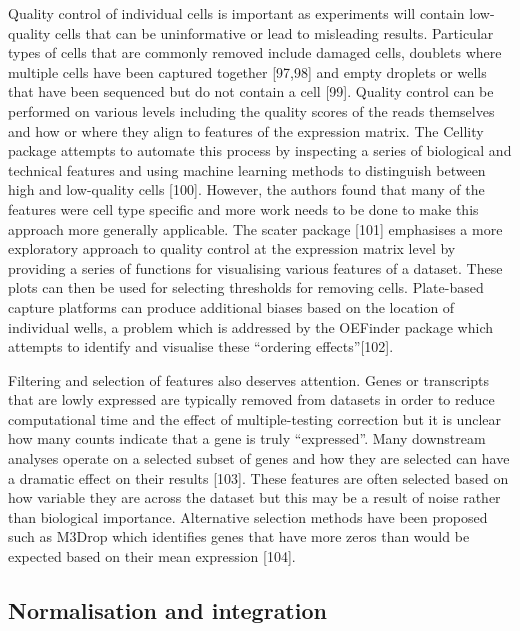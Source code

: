 \documentclass[11pt,a4paper,titlepage,twoside,openright]{style/unimelbthesis}
\theoremstyle{definition}
\theoremstyle{definition}
\theoremstyle{definition}
\theoremstyle{remark}
\begin{document}
\begin{mainmatter}
Quality control of individual cells is important as experiments will contain low-quality cells that can be uninformative or lead to misleading results. Particular types of cells that are commonly removed include damaged cells, doublets where multiple cells have been captured together {[}97,98{]} and empty droplets or wells that have been sequenced but do not contain a cell {[}99{]}. Quality control can be performed on various levels including the quality scores of the reads themselves and how or where they align to features of the expression matrix. The Cellity package attempts to automate this process by inspecting a series of biological and technical features and using machine learning methods to distinguish between high and low-quality cells {[}100{]}. However, the authors found that many of the features were cell type specific and more work needs to be done to make this approach more generally applicable. The scater package {[}101{]} emphasises a more exploratory approach to quality control at the expression matrix level by providing a series of functions for visualising various features of a dataset. These plots can then be used for selecting thresholds for removing cells. Plate-based capture platforms can produce additional biases based on the location of individual wells, a problem which is addressed by the OEFinder package which attempts to identify and visualise these \enquote{ordering effects}{[}102{]}.

Filtering and selection of features also deserves attention. Genes or transcripts that are lowly expressed are typically removed from datasets in order to reduce computational time and the effect of multiple-testing correction but it is unclear how many counts indicate that a gene is truly \enquote{expressed}. Many downstream analyses operate on a selected subset of genes and how they are selected can have a dramatic effect on their results {[}103{]}. These features are often selected based on how variable they are across the dataset but this may be a result of noise rather than biological importance. Alternative selection methods have been proposed such as M3Drop which identifies genes that have more zeros than would be expected based on their mean expression {[}104{]}.

\hypertarget{normalisation-and-integration}{%
\subsection{Normalisation and integration}\label{normalisation-and-integration}}


\end{mainmatter}
\end{document}
